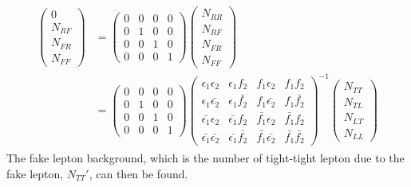 \begin{align}
\begin{split}
\left( \begin{array}{c}
0 \\
N_{RF} \\
N_{FR} \\
N_{FF}
\end{array} \right)
&=
\left( \begin{array}{cccc}
0 & 0 & 0 & 0 \\
0 & 1 & 0 & 0 \\
0 & 0 & 1 & 0 \\
0 & 0 & 0 & 1
\end{array} \right)
\left( \begin{array}{c}
N_{RR} \\
N_{RF} \\
N_{FR} \\
N_{FF}
\end{array} \right) \\
&=
\left( \begin{array}{cccc}
0 & 0 & 0 & 0 \\
0 & 1 & 0 & 0 \\
0 & 0 & 1 & 0 \\
0 & 0 & 0 & 1
\end{array} \right)
\left( \begin{array}{cccc}
\epsilon_1 \epsilon_2 & \epsilon_1 f_2 & f_1 \epsilon_2 & f_1 f_2 \\
\epsilon_1 \bar{\epsilon_2} & \epsilon_1 \bar{f_2} & f_1 \bar{\epsilon_2} & f_1 \bar{f_2} \\
\bar{\epsilon_1} \epsilon_2 & \bar{\epsilon_1} f_2 & \bar{f_1} \epsilon_2 & \bar{f_1} f_2 \\
\bar{\epsilon_1} \bar{\epsilon_2} & \bar{\epsilon_1} \bar{f_2} & \bar{f_1} \bar{\epsilon_2} & \bar{f_1} \bar{f_2}
\end{array} \right)^{-1}
\left( \begin{array}{c}
N_{TT} \\
N_{TL} \\
N_{LT} \\
N_{LL}
\end{array} \right)
\end{split}
\end{align}
The fake lepton background, which is the number of tight-tight lepton due to the fake lepton, $N_{TT}'$, can then be found.
